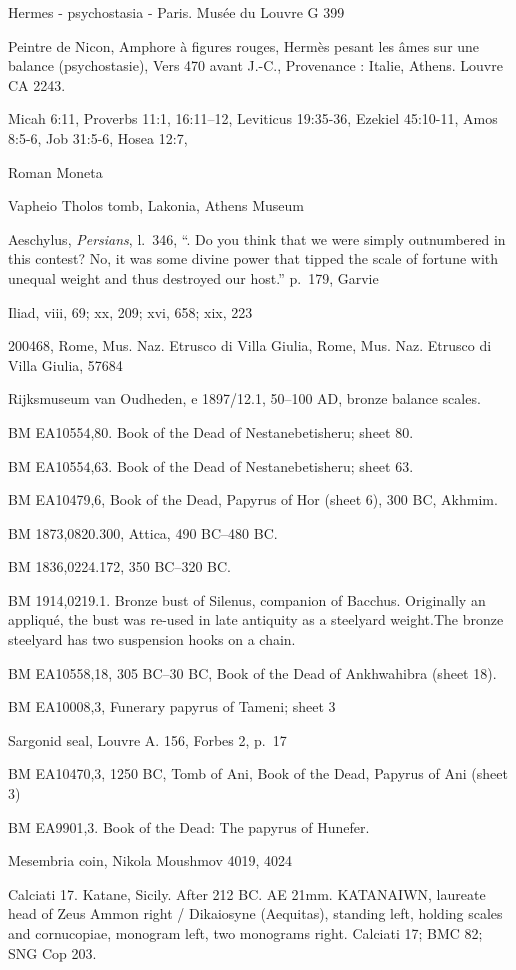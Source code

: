 \documentclass{article}
\begin{document}
Hermes - psychostasia - Paris. Mus\'ee du Louvre G 399 

Peintre de Nicon, Amphore \`a figures rouges,
Hermès  pesant les âmes sur une balance (psychostasie),
Vers 470 avant J.-C.,
Provenance : Italie,
Athens. Louvre CA 2243.

Micah 6:11, Proverbs 11:1, 16:11--12, Leviticus 19:35-36,
Ezekiel 45:10-11, Amos 8:5-6, Job 31:5-6,
Hosea 12:7, 


Roman Moneta

Vapheio Tholos tomb, Lakonia, Athens Museum

Aeschylus, {\em Persians},
l.~346, ``. Do you think that we were simply outnumbered in this contest? No, it was some divine power that tipped the scale of fortune with unequal weight and thus destroyed our host.''
p.~179, Garvie

Iliad, viii, 69; xx, 209; xvi, 658; xix, 223

200468, Rome, Mus. Naz. Etrusco di Villa Giulia, Rome, Mus. Naz. Etrusco di Villa Giulia, 57684

Rijksmuseum van Oudheden, e 1897/12.1, 50--100 AD, bronze balance scales.

BM EA10554,80. Book of the Dead of Nestanebetisheru; sheet 80.

BM EA10554,63. Book of the Dead of Nestanebetisheru; sheet 63.

BM EA10479,6, Book of the Dead, Papyrus of Hor (sheet 6), 300 BC, Akhmim.

BM 1873,0820.300, Attica, 490 BC--480 BC.

BM 1836,0224.172, 350 BC--320 BC.

BM 1914,0219.1. Bronze bust of Silenus, companion of Bacchus. Originally an appliqué, the bust was re-used in late antiquity as a steelyard weight.The bronze steelyard has two suspension hooks on a chain.

BM EA10558,18, 305 BC--30 BC, Book of the Dead of Ankhwahibra (sheet 18).

BM EA10008,3, Funerary papyrus of Tameni; sheet 3

Sargonid seal, Louvre A. 156, Forbes 2, p.~17

BM EA10470,3, 1250 BC, Tomb of Ani, Book of the Dead, Papyrus of Ani (sheet 3)

BM EA9901,3. Book of the Dead: The papyrus of Hunefer.

Mesembria coin, Nikola Moushmov  4019, 4024

Calciati 17. Katane, Sicily. After 212 BC. AE 21mm. KATANAIWN, laureate head of Zeus Ammon right / Dikaiosyne (Aequitas), standing left, holding scales and cornucopiae, monogram left, two monograms right. Calciati 17; BMC 82; SNG Cop 203.
\end{document}
